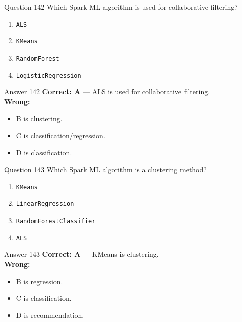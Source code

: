 \documentclass[aspectratio=169,11pt]{beamer}
\begin{document}
	\begin{frame}{Question 142}
		Which Spark ML algorithm is used for collaborative filtering?
		\begin{enumerate}[label=\Alph*.]
			\item \texttt{ALS}
			\item \texttt{KMeans}
			\item \texttt{RandomForest}
			\item \texttt{LogisticRegression}
		\end{enumerate}
	\end{frame}
	\begin{frame}{Answer 142}
		\textbf{Correct: A} --- ALS is used for collaborative filtering.\\
		\vspace{0.5em}
		\textbf{Wrong:}
		\begin{itemize}
			\item B is clustering.
			\item C is classification/regression.
			\item D is classification.
		\end{itemize}
	\end{frame}
	
	\begin{frame}{Question 143}
		Which Spark ML algorithm is a clustering method?
		\begin{enumerate}[label=\Alph*.]
			\item \texttt{KMeans}
			\item \texttt{LinearRegression}
			\item \texttt{RandomForestClassifier}
			\item \texttt{ALS}
		\end{enumerate}
	\end{frame}
	\begin{frame}{Answer 143}
		\textbf{Correct: A} --- KMeans is clustering.\\
		\vspace{0.5em}
		\textbf{Wrong:}
		\begin{itemize}
			\item B is regression.
			\item C is classification.
			\item D is recommendation.
		\end{itemize}
	\end{frame}
	
\end{document}
